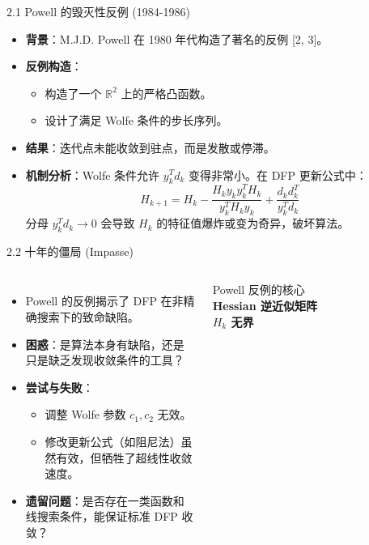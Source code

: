 \documentclass[11pt,hyperref={pdfpagelabels=false}]{beamer}
\begin{document}
\begin{frame}{2.1 Powell 的毁灭性反例 (1984-1986)}
    \begin{itemize}
        \item \textbf{背景}：M.J.D. Powell 在 1980 年代构造了著名的反例 [2, 3]。
        \item \textbf{反例构造}：
        \begin{itemize}
            \item 构造了一个 $\mathbb{R}^2$ 上的严格凸函数。
            \item 设计了满足 Wolfe 条件的步长序列。
        \end{itemize}
        \item \textbf{结果}：迭代点未能收敛到驻点，而是发散或停滞。
        \item \textbf{机制分析}：Wolfe 条件允许 $y_k^T d_k$ 变得非常小。在 DFP 更新公式中：
            \begin{equation*}
                H_{k+1} = H_k - \frac{H_k y_k y_k^T H_k}{y_k^T H_k y_k} + \frac{d_k d_k^T}{y_k^T d_k}
            \end{equation*}
            分母 $y_k^T d_k \to 0$ 会导致 $H_k$ 的特征值爆炸或变为奇异，破坏算法。
    \end{itemize}
\end{frame}

\begin{frame}{2.2 十年的僵局 (Impasse)}
    \begin{columns}
        \begin{itemize}
            \item Powell 的反例揭示了 DFP 在非精确搜索下的致命缺陷。
            \item \textbf{困惑}：是算法本身有缺陷，还是只是缺乏发现收敛条件的工具？
            \item \textbf{尝试与失败}：
            \begin{itemize}
                \item 调整 Wolfe 参数 $c_1, c_2$ 无效。
                \item 修改更新公式（如阻尼法）虽然有效，但牺牲了超线性收敛速度。
            \end{itemize}
            \item \textbf{遗留问题}：是否存在一类函数和线搜索条件，能保证标准 DFP 收敛？
        \end{itemize}

        \begin{block}{Powell 反例的核心}
            \centering
            \textbf{Hessian 逆近似矩阵 $H_k$ 无界}
        \end{block}
        \begin{figure}
            \vspace{-0.3cm}
        \end{figure}
    \end{columns}
\end{frame}
\end{document}
